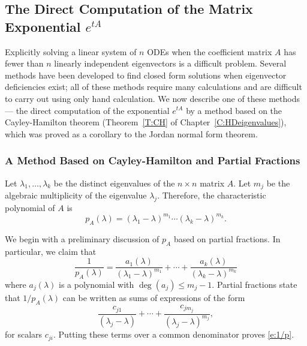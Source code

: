 \documentclass{ximera}
\begin{document}
\subsection*{The Direct Computation of the Matrix Exponential $e^{tA}$}

Explicitly solving a linear system of $n$ ODEs when the coefficient 
matrix $A$ has fewer than $n$ linearly independent eigenvectors is 
a difficult problem.  Several methods have been developed to find 
closed form solutions when eigenvector deficiencies exist; all of these 
methods require many calculations and are difficult to carry out using 
only hand calculation.  We now describe one of these methods --- the 
direct computation of the exponential $e^{tA}$ by a method based on the 
Cayley-Hamilton theorem 
(Theorem~\ref{T:CH} of 
Chapter~\ref{C:HDeigenvalues}), which was proved as a corollary to the 
Jordan normal form theorem.

\subsubsection*{A Method Based on Cayley-Hamilton and Partial Fractions}

Let $\lambda_1,\ldots,\lambda_k$ be the distinct eigenvalues of the 
$n\times n$ matrix $A$.  Let $m_j$ be the algebraic multiplicity of the 
eigenvalue $\lambda_j$.  Therefore, the characteristic polynomial
 of $A$ is 
\[
p_A(\lambda) = (\lambda_1-\lambda)^{m_1}\cdots(\lambda_k-\lambda)^{m_k}.
\]

We begin with a preliminary discussion of $p_A$ based on partial fractions.
In particular, we claim that 
\begin{equation}  \label{e:1/p}
\frac{1}{p_A(\lambda)} = \frac{a_1(\lambda)}{(\lambda_1-\lambda)^{m_1}} +\cdots
	+ \frac{a_k(\lambda)}{(\lambda_k-\lambda)^{m_k}}
\end{equation}
where $a_j(\lambda)$ is a polynomial with $\deg(a_j)\leq m_j-1$.  Partial 
fractions state that $1/p_A(\lambda)$ can be written as sums of expressions 
of the form
\[
\frac{c_{j1}}{(\lambda_j-\lambda)} + \cdots + \frac{c_{jm_j}}{(\lambda_j-\lambda)^{m_j}},
\]
for scalars $c_{ji}$.  Putting these terms over a common denominator proves 
\eqref{e:1/p}.
\end{document}
